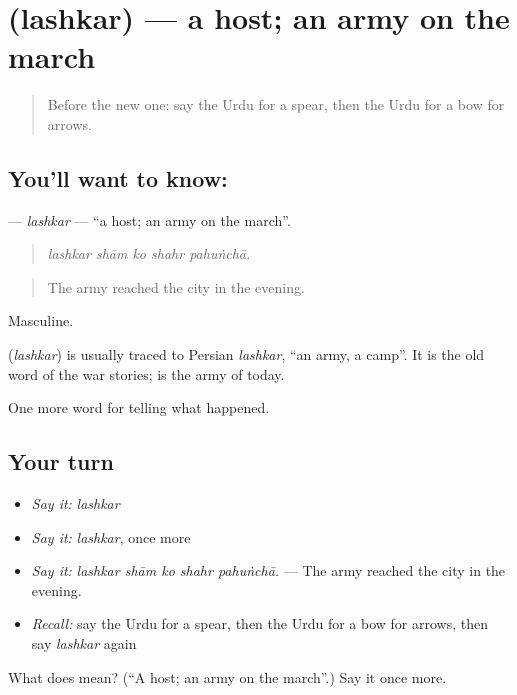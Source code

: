 \section[\texorpdfstring{\ur{لشکر} (lashkar)}{لشکر (lashkar)}]{ (lashkar) — a host; an army on the march}

\label{lesson:UR-C310-lashkar}



\begin{quote}
Before the new one: say the Urdu for a spear, then the Urdu for a bow for arrows.
\end{quote}

\subsection*{You'll want to know: }
\textbf{} — \emph{lashkar} — \textquotedblleft{}a host; an army on the march\textquotedblright{}.

\begin{quote}
    
\end{quote}

\begin{quote}
\emph{lashkar shām ko shahr pahuṅchā.}
\end{quote}

\begin{quote}
The army reached the city in the evening.
\end{quote}

Masculine.

\begin{cousinweb}
\textbf{} (\emph{lashkar}) is usually traced to Persian \emph{lashkar}, \textquotedblleft{}an army, a camp\textquotedblright{}. It is the old word of the war stories; \textbf{} is the army of today.
\end{cousinweb}

\begin{grammarlens}[title={What you've built}]
One more word for telling what happened.
\end{grammarlens}

\subsection*{Your turn}
\begin{itemize}
\raggedright
  \item \emph{Say it:} \emph{lashkar}
  \item \emph{Say it:} \emph{lashkar}, once more
  \item \emph{Say it:} \emph{lashkar shām ko shahr pahuṅchā.} — The army reached the city in the evening.
  \item \emph{Recall:} say the Urdu for a spear, then the Urdu for a bow for arrows, then say \emph{lashkar} again
\end{itemize}

\begin{tcolorbox}[breakable,colback=teal!4,colframe=teal!35!black,title={Before you move on}]
What does  mean? (\textquotedblleft{}A host; an army on the march\textquotedblright{}.) Say it once more.
\end{tcolorbox}
